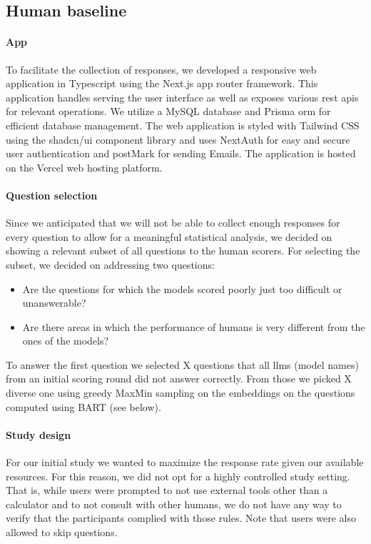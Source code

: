 \documentclass[11pt, oneside]{article}
\begin{document}
\subsection{Human baseline}

\paragraph{App} To facilitate the collection of responses, we developed a responsive web application in Typescript using the Next.js\cite{nextjs} app router framework.
This application handles serving the user interface as well as exposes various \gls{rest} \glspl{api} for relevant operations.
We utilize a MySQL\cite{mysql} database and Prisma \gls{orm}\cite{prisma} for efficient database management.
The web application is styled with Tailwind CSS\cite{tailwindcss} using the shadcn/ui component library and uses NextAuth\cite{nextauth} for easy and secure user authentication and postMark for sending Emails.
The application is hosted on the Vercel web hosting platform.

\paragraph{Question selection} \label{sec:subset-selection}
Since we anticipated that we will not be able to collect enough responses for every question to allow for a meaningful statistical analysis, we decided on showing a relevant subset of all questions to the human scorers.
For selecting the subset, we decided on addressing two questions:
\begin{itemize}
    \item Are the questions for which the models scored poorly just too difficult or unanswerable?
    \item Are there areas in which the performance of humans is very different from the ones of the models?
\end{itemize}
To answer the first question we selected X questions that all \glspl{llm} (model names) from an initial scoring round did not answer correctly.
From those we picked X diverse one using greedy MaxMin sampling on the embeddings on the questions computed using BART (see below).


\paragraph{Study design}
For our initial study we wanted to maximize the response rate given our available resources. For this reason, we did not opt for a highly controlled study setting. That is, while users were prompted to not use external tools other than a calculator and to not consult with other humans, we do not have any way to verify that the participants complied with those rules. Note that users were also allowed to skip questions.
\end{document}
